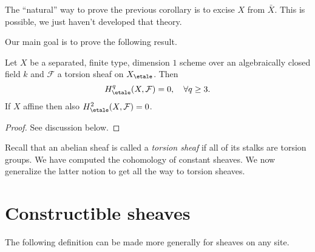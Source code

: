 \begin{remark}
\label{remark-natural-proof}
The ``natural'' way to prove the previous corollary is to excise $X$ from $\bar
X$. This is possible, we just haven't developed that theory.
\end{remark}

\noindent
Our main goal is to prove the following result.

\begin{theorem}
\label{theorem-vanishing-curves}
Let $X$ be a separated, finite type, dimension $1$ scheme over an algebraically
closed field $k$ and $\mathcal{F}$ a torsion sheaf on $X_\etale$. Then
$$
H_\etale^q(X, \mathcal{F}) = 0, \quad \forall q\geq 3.
$$
If $X$ affine then also $H_\etale^2(X, \mathcal{F}) = 0$.
\end{theorem}

\begin{proof}
See discussion below.
\end{proof}

\noindent
Recall that an abelian sheaf is called a {\it torsion sheaf} if all of its
stalks are torsion groups. We have computed the cohomology of constant sheaves.
We now generalize the latter notion to get all the way to torsion sheaves.




\section{Constructible sheaves}
\label{section-constructible}

\noindent
The following definition can be made more generally for sheaves on any site.

